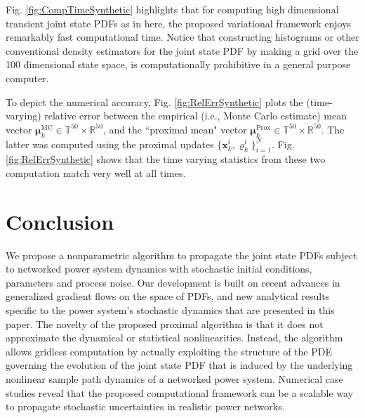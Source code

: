 \documentclass[10pt,twocolumn]{IEEEtran}
\begin{document}
Fig. \ref{fig:CompTimeSynthetic} highlights that for computing high dimensional transient joint state PDFs as in here, the proposed variational framework enjoys remarkably fast computational time. Notice that constructing histograms or other conventional density estimators for the joint state PDF by making a grid over the 100 dimensional state space, is computationally prohibitive in a general purpose computer. 

To depict the numerical accuracy, Fig. \ref{fig:RelErrSynthetic} plots the (time-varying) relative error between the empirical (i.e., Monte Carlo estimate) mean vector $\bm{\mu}_{k}^{\text{MC}}\in\mathbb{T}^{50}\times\mathbb{R}^{50}$, and the ``proximal mean" vector $\bm{\mu}_{k}^{\text{Prox}}\in\mathbb{T}^{50}\times\mathbb{R}^{50}$. The latter was computed using the proximal updates $\{\bm{x}_{k}^{i},\varrho_{k}^{i}\}_{i=1}^{N}$. Fig. \ref{fig:RelErrSynthetic} shows that the time varying statistics from these two computation match very well at all times.




\vspace*{-0.1in}
\section{Conclusion}\label{sec:conclusion}
We propose a nonparametric algorithm to propagate the joint state PDFs subject to networked power system dynamics with stochastic initial conditions, parameters and process noise. Our development is built on recent advances in generalized gradient flows on the space of PDFs, and new analytical results specific to the power system's stochastic dynamics that are presented in this paper. The novelty of the proposed proximal algorithm is that it does not approximate the dynamical or statistical nonlinearities. Instead, the algorithm allows gridless computation by actually exploiting the structure of the PDE governing the evolution of the joint state PDF that is induced by the underlying nonlinear sample path dynamics of a networked power system. Numerical case studies reveal that the proposed computational framework can be a scalable way to propagate stochastic uncertainties in realistic power networks.

\end{document}
